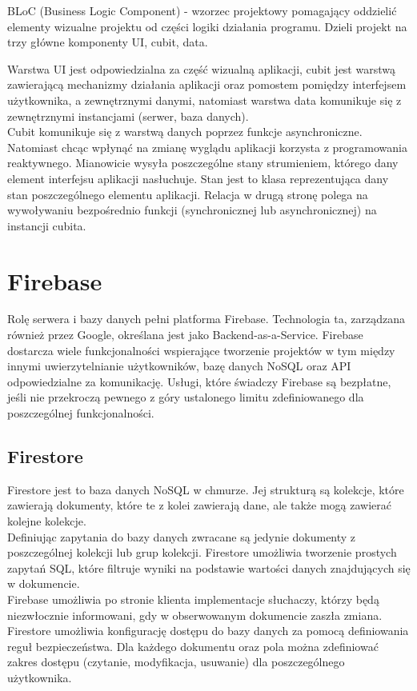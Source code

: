 BLoC (Business Logic Component) - wzorzec projektowy pomagający oddzielić elementy wizualne projektu od części logiki działania programu. Dzieli projekt na trzy główne komponenty UI, cubit, data.

Warstwa UI jest odpowiedzialna za część wizualną aplikacji, cubit jest warstwą zawierającą mechanizmy działania aplikacji oraz pomostem pomiędzy interfejsem użytkownika, a zewnętrznymi danymi, natomiast warstwa data komunikuje się z zewnętrznymi instancjami (serwer, baza danych).\\

Cubit komunikuje się z warstwą danych poprzez funkcje asynchroniczne. Natomiast chcąc wpłynąć na zmianę wyglądu aplikacji korzysta z programowania reaktywnego. Mianowicie wysyła poszczególne stany strumieniem, którego dany element interfejsu aplikacji nasłuchuje. Stan jest to klasa reprezentująca dany stan poszczególnego elementu aplikacji. Relacja w drugą stronę polega na wywoływaniu bezpośrednio funkcji (synchronicznej lub asynchronicznej) na instancji cubita.

\section{Firebase}

Rolę serwera i bazy danych pełni platforma Firebase. Technologia ta, zarządzana również przez Google, określana jest jako Backend-as-a-Service. Firebase dostarcza wiele funkcjonalności wspierające tworzenie projektów w tym między innymi uwierzytelnianie użytkowników, bazę danych NoSQL oraz API odpowiedzialne za komunikację. Usługi, które świadczy Firebase są bezpłatne, jeśli nie przekroczą pewnego z góry ustalonego limitu zdefiniowanego dla poszczególnej funkcjonalności. 

\subsection{Firestore}

Firestore jest to baza danych NoSQL w chmurze. Jej strukturą są kolekcje, które zawierają dokumenty, które te z kolei zawierają dane, ale także mogą zawierać kolejne kolekcje. \\
Definiując zapytania do bazy danych zwracane są jedynie dokumenty z poszczególnej kolekcji lub grup kolekcji. Firestore umożliwia tworzenie prostych zapytań SQL, które filtruje wyniki na podstawie wartości danych znajdujących się w dokumencie. \\
Firebase umożliwia po stronie klienta implementacje słuchaczy, którzy będą niezwłocznie informowani, gdy w obserwowanym dokumencie zaszła zmiana. \\
Firestore umożliwia konfigurację dostępu do bazy danych za pomocą definiowania reguł bezpieczeństwa. Dla każdego dokumentu oraz pola można zdefiniować zakres dostępu (czytanie, modyfikacja, usuwanie) dla poszczególnego użytkownika.


